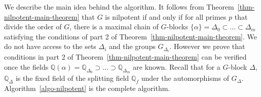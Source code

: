 \documentclass[11pt]{madras}%
\theoremstyle{remark}
\begin{document}
We describe the main idea behind the algorithm.  It follows {from}
Theorem~\ref{thm-nilpotent-main-theorem} that $G$ is nilpotent if and
only if for all primes $p$ that divide the order of $G$, there is a
maximal chain of $G$-blocks $\{\alpha \} = \Delta_0\subset \ldots
\subset \Delta_m$ satisfying the conditions of part 2 of
Theorem~\ref{thm-nilpotent-main-theorem}. We do not have access to the
sets $\Delta_i$ and the groups $G_{\Delta_i}$. However we prove that
conditions in part 2 of Theorem~\ref{thm-nilpotent-main-theorem} can
be verified once the fields $\mathbb{Q}(\alpha) =
\mathbb{Q}_{\Delta_0} \supset \ldots \supset \mathbb{Q}_{\Delta_m}$
are known.  Recall that for a $G$-block $\Delta$, $\mathbb{Q}_\Delta$
is the fixed field of the splitting field $\mathbb{Q}_f$ under the
automorphisms of $G_\Delta$. Algorithm~\ref{algo-nilpotent} is the
complete algorithm. 
\end{document}
